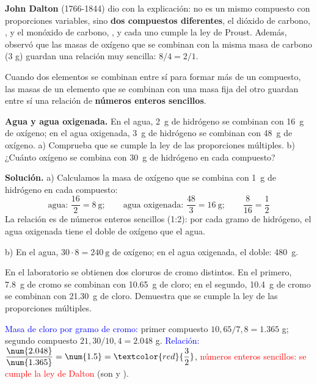 \textbf{John Dalton} (1766-1844) dio con la explicación: no es un mismo compuesto con proporciones variables, sino \textbf{dos
compuestos diferentes}, el dióxido de carbono, , y el monóxido de carbono, , y cada uno cumple la ley de
Proust. Además, observó que las masas de oxígeno que se combinan con la misma masa de carbono (3 g) guardan una relación muy
sencilla: \(8/4 = 2/1\).

\begin{definition}
    Cuando dos elementos se combinan entre sí para formar más de un compuesto, las masas de un elemento que se combinan con
    una masa fija del otro guardan entre sí una relación de \textbf{números enteros sencillos}.
\end{definition}

\begin{example}
    \textbf{Agua y agua oxigenada.} En el agua, \qty{2}{\gram} de hidrógeno se combinan con \qty{16}{\gram} de oxígeno; en el
    agua oxigenada, \qty{3}{\gram} de hidrógeno se combinan con \qty{48}{\gram} de oxígeno. a) Comprueba que se cumple la ley de
    las proporciones múltiples. b) ¿Cuánto oxígeno se combina con \qty{30}{\gram} de hidrógeno en cada compuesto?

    \textbf{Solución.} a) Calculamos la masa de oxígeno que se combina con \qty{1}{\gram} de hidrógeno en cada compuesto:
    \[ \text{agua: } \frac{16}{2} = \qty{8}{\gram}; \qquad \text{agua oxigenada: } \frac{48}{3} = \qty{16}{\gram}; \qquad
    \frac{8}{16} = \frac{1}{2} \]
    La relación es de números enteros sencillos (1:2): por cada gramo de hidrógeno, el agua oxigenada tiene el doble de
    oxígeno que el agua.

    b) En el agua, \(30 \cdot 8 = \qty{240}{\gram}\) de oxígeno; en el agua oxigenada, el doble: \qty{480}{\gram}.
\end{example}

\begin{exercise}
    En el laboratorio se obtienen dos cloruros de cromo distintos. En el primero, \qty{7.8}{\gram} de cromo se combinan con
    \qty{10.65}{\gram} de cloro; en el segundo, \qty{10.4}{\gram} de cromo se combinan con \qty{21.30}{\gram} de cloro.
    Demuestra que se cumple la ley de las proporciones múltiples.
    \begin{solu}
        \textcolor{blue}{Masa de cloro por gramo de cromo:} primer compuesto \(10{,}65/7{,}8 = \num{1.365}\) g; segundo
        compuesto \(21{,}30/10{,}4 = \num{2.048}\) g.
        \textcolor{blue}{Relación:} \(\dfrac{\num{2.048}}{\num{1.365}} = \num{1.5} = \textcolor{red}{\dfrac{3}{2}}\), \textcolor{red}{números
        enteros sencillos: se cumple la ley de Dalton} (son  y ).
    \end{solu}
\end{exercise}

